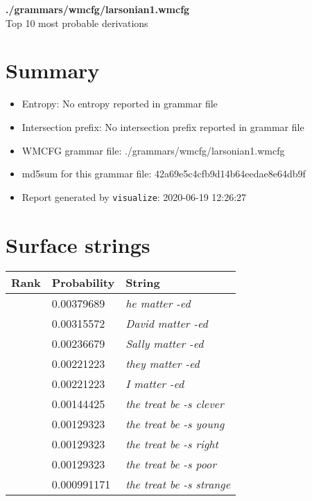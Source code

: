 \documentclass[11pt]{article}
\begin{document}
\begin{center}
{\huge \textbf{./grammars/wmcfg/larsonian1.wmcfg}} \\[0.5em]
{\normalsize Top 10 most probable derivations}
\end{center}

\section{Summary}
\begin{itemize}
	\item Entropy: No entropy reported in grammar file
	\item Intersection prefix: No intersection prefix reported in grammar file
	\item WMCFG grammar file: ./grammars/wmcfg/larsonian1.wmcfg
	\item md5sum for this grammar file: 42a69e5c4cfb9d14b64eedae8e64db9f
	\item Report generated by \texttt{visualize}: 2020-06-19 12:26:27
\end{itemize}

\section{Surface strings}
\hspace{1em}
\renewcommand{\arraystretch}{1.15}
\newcommand\rownumber{\stepcounter{rownumber}\arabic{rownumber}}
\begin{tabular}{l l l}
	\hline
	 Rank & Probability & String \\
	\hline
\rownumber & 0.00379689 & \textit{he matter -ed} \\
\rownumber & 0.00315572 & \textit{David matter -ed} \\
\rownumber & 0.00236679 & \textit{Sally matter -ed} \\
\rownumber & 0.00221223 & \textit{they matter -ed} \\
\rownumber & 0.00221223 & \textit{I matter -ed} \\
\rownumber & 0.00144425 & \textit{the treat be -s clever} \\
\rownumber & 0.00129323 & \textit{the treat be -s young} \\
\rownumber & 0.00129323 & \textit{the treat be -s right} \\
\rownumber & 0.00129323 & \textit{the treat be -s poor} \\
\rownumber & 0.000991171 & \textit{the treat be -s strange} \\
	\hline
\end{tabular}
\pagebreak
\end{document}
